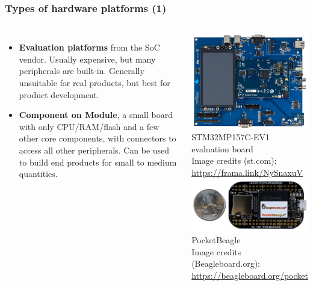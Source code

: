 \begin{frame}
  \frametitle{Types of hardware platforms (1)}
  \begin{columns}
  \begin{itemize}
  \item {\bf Evaluation platforms} from the SoC vendor. Usually
    expensive, but many peripherals are built-in. Generally unsuitable
    for real products, but best for product development.
  \item {\bf Component on Module}, a small board with only
    CPU/RAM/flash and a few other core components, with connectors to
    access all other peripherals. Can be used to build end products
    for small to medium quantities.
  \end{itemize}
    \includegraphics[width=\textwidth]{slides/sysdev-intro/stm32mp157c-ev1.png}
    \scriptsize
    STM32MP157C-EV1 evaluation board\\
    \tiny
    Image credits (st.com):\\
    \url{https://frama.link/NySnaxuV}\\
    \vspace{0.5cm}
    \includegraphics[width=\textwidth]{slides/sysdev-intro/pocketbeagle.png}
    \scriptsize
    PocketBeagle\\
    \tiny
    Image credits (Beagleboard.org):\\
    \url{https://beagleboard.org/pocket}
  \end{columns}
\end{frame}

